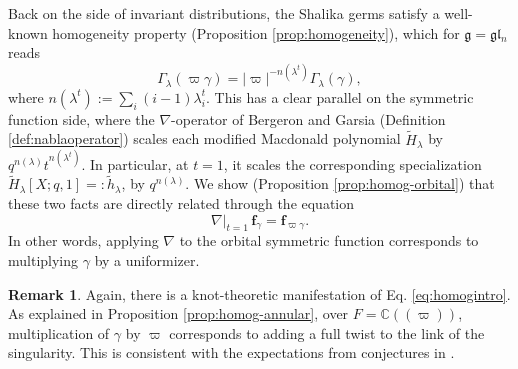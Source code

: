 \documentclass{amsart}
\numberwithin{equation}{section}
\theoremstyle{definition}
\newtheorem{example}[lemma]{Example}%
\newtheorem{remark}[lemma]{Remark}%
\def\16{{\bf 16}}
\def\1{{\bf 1}}
\def\tilde{\widetilde}
\newcommand{\tH}{\widetilde{H}}
\renewcommand{\th}{\tilde{h}}
\newcommand{\fgamma}{\mathbf{f}_{\gamma}}
\newcommand{\fl}{\mathfrak{l}}
\newcommand{\fg}{\mathfrak{g}}
\newcommand{\C}{{\mathbb C}}
\begin{document}



Back on the side of invariant distributions, the Shalika germs satisfy a well-known homogeneity property (Proposition \ref{prop:homogeneity}), which for  $\fg=\fg\fl_n$ reads
$$\Gamma_{\lambda}(\varpi\gamma)=|\varpi|^{-n(\lambda^t)}\Gamma_\lambda(\gamma),$$
where $n(\lambda^t):=\sum_i(i-1)\lambda^t_i$. 
This has a clear parallel on the symmetric function side, where the $\nabla$-operator of Bergeron and Garsia (Definition \ref{def:nablaoperator}) scales each modified Macdonald polynomial $\tH_\lambda$ by $q^{n(\lambda)}t^{n(\lambda^t)}$. In particular, at $t=1$, it scales the corresponding specialization $\tH_\lambda[X;q,1]=:\th_\lambda$, by $q^{n(\lambda)}$. We show (Proposition \ref{prop:homog-orbital}) that these two facts are directly related through the equation
\begin{equation}
\label{eq:homogintro}
\nabla|_{t=1}\, \fgamma=\mathbf{f}_{\varpi\gamma}.
\end{equation}
In other words, applying $\nabla$ to the orbital symmetric function corresponds to multiplying $\gamma$ by a uniformizer. 
\begin{remark}
Again, there is a knot-theoretic manifestation of Eq. \eqref{eq:homogintro}. As explained in Proposition \ref{prop:homog-annular}, over $F=\C((\varpi))$, multiplication of $\gamma$ by $\varpi$ corresponds to adding a full twist to the link of the singularity. This is consistent with the expectations from conjectures in \cite{CD,ORS}.
\end{remark}
\end{document}
